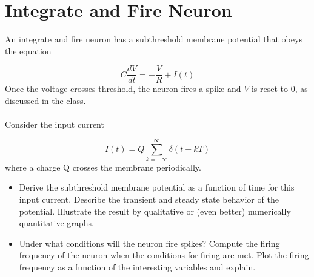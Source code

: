 \documentclass{article}
\begin{document}
\section*{Integrate and Fire Neuron}

An integrate and fire neuron has a subthreshold membrane potential that
obeys the equation

\bigskip
\begin{equation}
C\frac{dV}{dt}=-\frac{V}{R}+I(t)  \label{eqn:IF}
\end{equation}
Once the voltage crosses threshold, the neuron fires a spike and $V$ is
reset to $0 $, as discussed in the class.
\\
\\
Consider the input current

\begin{equation}
I(t)=Q\sum_{k=-\infty }^{\infty }\delta (t-kT)
\end{equation}
where a charge Q crosses the membrane periodically.

\begin{itemize}
\item  Derive the subthreshold membrane potential as a function of time
for this input current. Describe the transient and steady state
behavior of the potential. Illustrate the result by qualitative or
(even better) numerically quantitative graphs.

\item Under what conditions will the neuron fire spikes? Compute the
firing frequency of the neuron when the conditions for firing are
met. Plot the firing frequency as a function of the interesting
variables and explain.\newline
\end{itemize}
\end{document}
